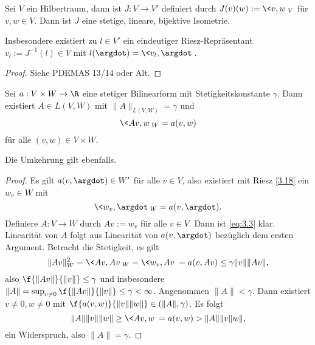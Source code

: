 \begin{st} \label{3.18}
	Sei $V$ ein Hilbertraum, dann ist $J: V \to V'$ definiert durch $J(v)(w) := \<v, w\>_V$ für $v, w \in V$.
	Dann ist $J$ eine stetige, lineare, bijektive Isometrie.

	Insbesondere existiert zu $l \in V'$ ein eindeutiger Riesz-Repräsentant $v_l := J^{-1}(l) \in V$ mit $l(\argdot) = \<v_l, \argdot\>$.
	\begin{proof}
		Siehe PDEMAS 13/14 oder Alt.
	\end{proof}
\end{st}

\begin{st} \label{3.19}
	Sei $a: V \times W \to \R$ eine stetiger Bilinearform mit Stetigkeitskonstante $\gamma$.
	Dann existiert $A \in L(V,W)$ mit $\|A\|_{L(V,W)} = \gamma$ und
	\begin{equation} \label{eq:3.3}
		\<Av, w\>_W = a(v,w)
	\end{equation}
	für alle $(v,w) \in V \times W$.
	\begin{note}
		Die Umkehrung gilt ebenfalls.
	\end{note}
	\begin{proof}
		Es gilt $a(v, \argdot) \in W'$ für alle $v \in V$, also existiert mit Riesz \ref{3.18} ein $w_v \in W$ mit
		\[
			\<w_v, \argdot\>_W = a(v,\argdot).
		\]
		Definiere $A: V \to W$ durch $Av := w_v$ für alle $v \in V$.
		Dann ist \eqref{eq:3.3} klar.
		Linearität von $A$ folgt aus Linearität von $a(v,\argdot)$ bezüglich dem ersten Argument.
		Betracht die Stetigkeit, es gilt
		\[
			\|Av\|_W^2
			= \<Av, Av\>_W
			= \<w_v, Av\>
			= a(v, Av)
			\le \gamma \|v\| \|Av\|,
		\]
		also $\f{\|Av\|}{\|v\|} \le \gamma$ und insbesondere $\|A\| = \sup_{v \neq 0} \f{\|Av\|}{\|v\|} \le \gamma < \infty$.
		Angenommen $\|A\| < \gamma$.
		Dann existiert $v \neq 0, w \neq 0$ mit $\f{a(v,w)}{\|v\|\|w\|} \in (\|A\|, \gamma)$.
		Es folgt
		\[
			\|A\|\|v\|\|w\|
			\ge \<Av, w\>
			= a(v,w)
			> \|A\|\|v\|w\|,
		\]
		ein Widerspruch, also $\|A\| = \gamma$.
	\end{proof}
\end{st}

